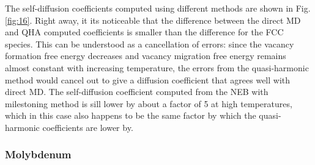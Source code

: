 \documentclass{article}
\begin{document}
The self-diffusion coefficients computed using different methods are shown in Fig. \ref{fig:16}. Right away, it its noticeable that the difference between the direct MD and QHA computed coefficients is smaller than the difference for the FCC species. This can be understood as a cancellation of errors: since the vacancy formation free energy decreases and vacancy migration free energy remains almost constant with increasing temperature, the errors from the quasi-harmonic method would cancel out to give a diffusion coefficient that agrees well with direct MD. The self-diffusion coefficient computed from the NEB with milestoning method is sill lower by about a factor of 5 at high temperatures, which in this case also happens to be the same factor by which the quasi-harmonic coefficients are lower by.

\subsubsection{Molybdenum}
\end{document}
